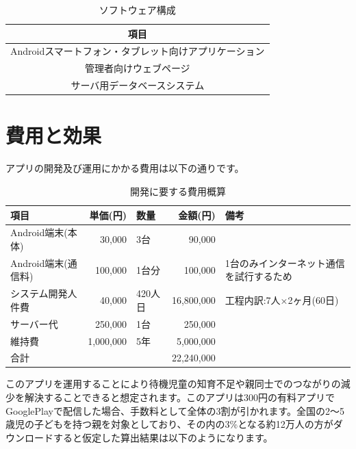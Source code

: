 \documentclass[a4j]{jarticle}
\begin{document}
\begin{table}[H]
    \caption{ソフトウェア構成}
    \label{tbl: table_software}
    \begin{center}
        \begin{tabular}{|c|} \hline
            項目 \\ \hline
            Androidスマートフォン・タブレット向けアプリケーション \\ \hline
            管理者向けウェブページ \\ \hline
            サーバ用データベースシステム \\ \hline
        \end{tabular}
    \end{center}
\end{table}

\section{費用と効果}
アプリの開発及び運用にかかる費用は以下の通りです。
　\begin{table}[htp]
\begin{center}
  \caption{開発に要する費用概算}
  \begin{tabular}{|l|r|l|r|l|}\hline
    項目& 単価(円) & 数量 & 金額(円) & 備考  \\ \hline
    Android端末(本体)& 30,000 & 3台 & 90,000 & 　 \\ \hline
    Android端末(通信料)& 100,000 & 1台分 & 100,000 & 1台のみインターネット通信を試行するため  \\ \hline
    システム開発人件費& 40,000 & 420人日 & 16,800,000 & 工程内訳:7人×2ヶ月(60日)  \\ \hline
    サーバー代& 250,000 & 1台 & 250,000 & 　 \\ \hline
    維持費& 1,000,000 & 5年 & 5,000,000 & 　　  \\ \hline
    \multicolumn{3}{|l|}{合計} & 22,240,000 &　 \\ \hline
  \end{tabular}
\end{center}
\end{table}

このアプリを運用することにより待機児童の知育不足や親同士でのつながりの減少を解決することできると想定されます。このアプリは300円の有料アプリでGooglePlayで配信した場合、手数料として全体の3割が引かれます。全国の2～5歳児の子どもを持つ親を対象としており、その内の3\%となる約12万人の方がダウンロードすると仮定した算出結果は以下のようになります。
\end{document}
